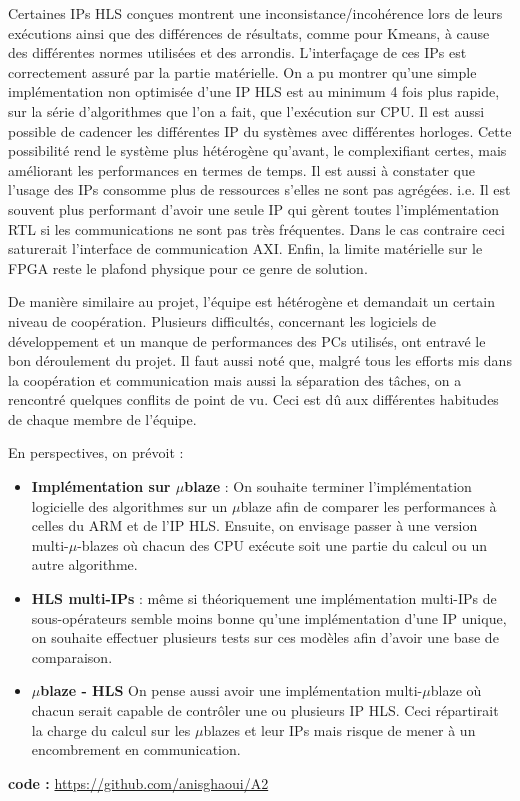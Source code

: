 \documentclass[12pt,a4paper]{article}
\begin{document}
Certaines IPs HLS conçues montrent une inconsistance/incohérence lors de leurs exécutions ainsi que des différences de résultats, comme pour Kmeans, à cause des différentes normes utilisées et des arrondis. L'interfaçage de ces IPs est correctement assuré par la partie matérielle. On a pu montrer qu'une simple implémentation non optimisée d'une IP HLS est au minimum 4 fois plus rapide, sur la série d'algorithmes que l'on a fait, que l'exécution sur CPU. Il est aussi possible de cadencer les différentes IP du systèmes avec différentes horloges. Cette possibilité rend le système plus hétérogène qu'avant, le complexifiant certes, mais améliorant les performances en termes de temps. Il est aussi à constater que l'usage des IPs consomme plus de ressources s'elles ne sont pas agrégées. i.e. Il est souvent plus performant d'avoir une seule IP qui gèrent toutes l'implémentation RTL si les communications ne sont pas très fréquentes. Dans le cas contraire ceci saturerait l'interface de communication AXI. Enfin, la limite matérielle sur le FPGA reste le plafond physique pour ce genre de solution.


De manière similaire au projet, l'équipe est hétérogène et demandait un certain niveau de coopération. Plusieurs difficultés, concernant les logiciels de développement et un manque de performances des PCs utilisés, ont entravé le bon déroulement du projet. Il faut aussi noté que, malgré tous les efforts mis dans la coopération et communication mais aussi la séparation des tâches, on a rencontré quelques conflits de point de vu. Ceci est dû aux différentes habitudes de chaque membre de l'équipe.


En perspectives, on prévoit :

\begin{itemize}
\item \textbf{Implémentation sur $\mu$blaze} : On souhaite terminer l'implémentation logicielle des algorithmes sur un $\mu$blaze afin de comparer les performances à celles du ARM et de l'IP HLS. Ensuite, on envisage passer à une version multi-$\mu$-blazes où chacun des CPU exécute soit une partie du calcul ou un autre algorithme.
\item \textbf{HLS multi-IPs} : même si théoriquement une implémentation multi-IPs de sous-opérateurs semble moins bonne qu'une implémentation d'une IP unique, on souhaite effectuer plusieurs tests sur ces modèles afin d'avoir une base de comparaison.
\item \textbf{$\mu$blaze - HLS} On pense aussi avoir une implémentation multi-$\mu$blaze où chacun serait capable de contrôler une ou plusieurs IP HLS. Ceci répartirait la charge du calcul sur les $\mu$blazes et leur IPs mais risque de mener à un encombrement en communication.
\end{itemize}


\vfill
\textbf{code :} \href{https://github.com/anisghaoui/A2}{https://github.com/anisghaoui/A2}
\end{document}
